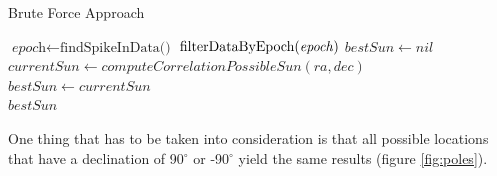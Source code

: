 \clearpage

\begin{algorithm}
	\caption{Brute Force Approach}\label{pseudocodeBruteForce}
	\begin{algorithmic}[1]
		\State $\textit{epoch} \gets \text{findSpikeInData()}$ 
		\State $\text{filterDataByEpoch(\textit{epoch})}$
		\State $bestSun \gets nil$
		\State $currentSun \gets computeCorrelationPossibleSun(ra, dec)$
		\State $bestSun \gets currentSun$
		\EndIf
		\EndFor
		\EndFor
		\\
		\Return $bestSun$
		\EndProcedure
	\end{algorithmic}
\end{algorithm}

One thing that has to be taken into consideration is that all possible locations that have a declination of 90$^{\circ}$ or -90$^{\circ}$ yield the same results (figure \ref{fig:poles}).

